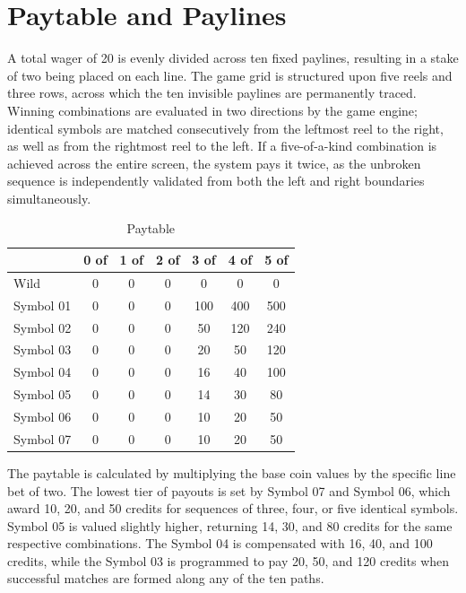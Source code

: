 \documentclass[12pt,twoside,openany]{book}
\begin{document}
\section{Paytable and Paylines}

A total wager of 20 is evenly divided across ten fixed paylines, resulting in a stake of two being placed on each line. The game grid is structured upon five reels and three rows, across which the ten invisible paylines are permanently traced. Winning combinations are evaluated in two directions by the game engine; identical symbols are matched consecutively from the leftmost reel to the right, as well as from the rightmost reel to the left. If a five-of-a-kind combination is achieved across the entire screen, the system pays it twice, as the unbroken sequence is independently validated from both the left and right boundaries simultaneously.

\begin{table}[htbp]
\centering
\begin{tabular}{lcccccc}
\hline
 & \textbf{0 of} & \textbf{1 of} & \textbf{2 of} & \textbf{3 of} & \textbf{4 of} & \textbf{5 of} \\
\hline
Wild & 0 & 0 & 0 & 0 & 0 & 0 \\
Symbol 01 & 0 & 0 & 0 & 100 & 400 & 500 \\
Symbol 02 & 0 & 0 & 0 & 50 & 120 & 240 \\
Symbol 03 & 0 & 0 & 0 & 20 & 50 & 120 \\
Symbol 04 & 0 & 0 & 0 & 16 & 40 & 100 \\
Symbol 05 & 0 & 0 & 0 & 14 & 30 & 80 \\
Symbol 06 & 0 & 0 & 0 & 10 & 20 & 50 \\
Symbol 07 & 0 & 0 & 0 & 10 & 20 & 50 \\
\hline
\end{tabular}
\caption{Paytable}
\end{table}

The paytable is calculated by multiplying the base coin values by the specific line bet of two. The lowest tier of payouts is set by Symbol 07 and Symbol 06, which award 10, 20, and 50 credits for sequences of three, four, or five identical symbols. Symbol 05 is valued slightly higher, returning 14, 30, and 80 credits for the same respective combinations. The Symbol 04 is compensated with 16, 40, and 100 credits, while the Symbol 03 is programmed to pay 20, 50, and 120 credits when successful matches are formed along any of the ten paths.
\end{document}

